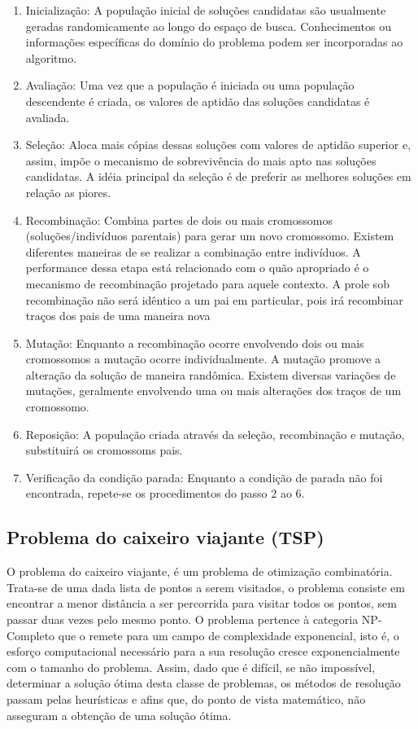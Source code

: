 \documentclass[twoside]{article}
\begin{document}
\begin{multicols}{2}
\begin{enumerate}
\setlength{\itemsep}{0.2cm}%
 \setlength{\parskip}{0.2cm}
\item Inicialização: A população inicial de soluções candidatas são usualmente geradas randomicamente ao longo do espaço de busca. Conhecimentos ou informações específicas do domínio do problema podem ser incorporadas ao algoritmo.
\item Avaliação: Uma vez que a população é iniciada ou uma população descendente é criada, os valores de aptidão das soluções candidatas é avaliada.
\item Seleção: Aloca mais cópias dessas soluções com valores de aptidão superior e, assim, impõe o mecanismo de sobrevivência do mais apto nas soluções candidatas. A idéia principal da seleção é de preferir as melhores soluções em relação as piores.
\item Recombinação: Combina partes de dois ou mais cromossomos (soluções/indivíduos parentais) para gerar um novo cromossomo. Existem diferentes maneiras de se realizar a combinação entre indivíduos. A performance dessa etapa está relacionado com o quão apropriado é o mecanismo de recombinação projetado para aquele contexto. A prole sob recombinação não será idêntico a um pai em particular, pois irá recombinar traços dos pais de uma maneira nova
\item Mutação: Enquanto a recombinação ocorre envolvendo dois ou mais cromossomos a mutação ocorre individualmente. A mutação promove a alteração da solução de maneira randômica. Existem diversas variações de mutações, geralmente envolvendo uma ou mais alterações dos traços de um cromossomo.
\item Reposição: A população criada através da seleção, recombinação e mutação, substituirá os cromossoms pais. 
\item Verificação da condição parada: Enquanto a condição de parada não foi encontrada, repete-se os procedimentos do passo 2 ao 6.
\end{enumerate}

\subsection{Problema do caixeiro viajante (TSP)}
O problema do caixeiro viajante, é um problema de otimização combinatória. Trata-se de uma dada lista de pontos a serem visitados, o problema consiste em encontrar a menor distância a ser percorrida para visitar todos os pontos, sem passar duas vezes pelo mesmo ponto.
O problema pertence à categoria NP-Completo que o remete para um campo de complexidade exponencial, isto é, o esforço computacional necessário para a sua resolução cresce exponencialmente com o tamanho do problema. Assim, dado que é difícil, se não impossível, determinar a solução ótima desta classe de problemas, os métodos de resolução passam pelas heurísticas e afins que, do ponto de vista matemático, não asseguram a obtenção de uma solução ótima.


\end{multicols}
\end{document}
